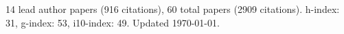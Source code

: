 14 lead author papers (916 citations),
60 total papers (2909 citations).\newline
h-index: 31, g-index: 53, i10-index: 49. Updated \today.